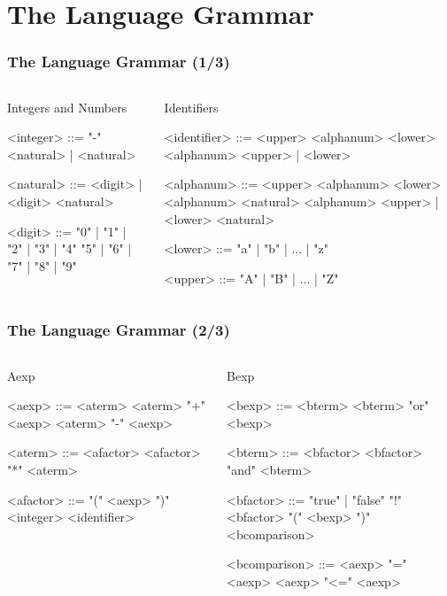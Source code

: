 \documentclass{beamer}
\begin{document}
\section{The Language Grammar}
\begin{frame}[fragile]
\footnotesize
\frametitle{The Language Grammar (1/3)}
\begin{columns}
\begin{block}{Integers and Numbers}
\begin{grammar}
	<integer> ::= "-" <natural> | <natural>

	<natural> ::= <digit> | <digit> <natural>

	<digit> ::= "0" | "1" | "2" | "3" | "4"
	\alt "5" | "6" | "7" | "8" | "9"
\end{grammar}
\end{block}
\begin{block}{Identifiers}
\begin{grammar}
	<identifier> ::= <upper> <alphanum>
	\alt <lower> <alphanum>
	\alt <upper> | <lower> 
	
	<alphanum> ::= <upper> <alphanum>
	\alt <lower> <alphanum>
	\alt <natural> <alphanum>
	\alt <upper> | <lower>
	\alt <natural>

	<lower> ::= "a" | "b" | ... | "z"

	<upper> ::= "A" | "B" | ... | "Z"
\end{grammar}
\end{block}
\end{columns}
\end{frame}
\begin{frame}[fragile]
\footnotesize
\frametitle{The Language Grammar (2/3)}
\begin{columns}
\begin{block}{Aexp}
\begin{grammar}
	<aexp> ::= <aterm>
	\alt <aterm> "+" <aexp>
	\alt <aterm> "-" <aexp>

	<aterm> ::= <afactor>
	\alt <afactor> "*" <aterm>

	<afactor> ::= "(" <aexp> ")"
	\alt <integer>
	\alt <identifier>
\end{grammar}
\end{block}
\begin{block}{Bexp}
\begin{grammar}
	<bexp> ::= <bterm>
	\alt <bterm> "or" <bexp>

	<bterm> ::= <bfactor>
	\alt <bfactor> "and" <bterm>

	<bfactor> ::= "true" | "false"
	\alt "!" <bfactor>
	\alt "(" <bexp> ")"
	\alt <bcomparison>

	<bcomparison> ::= <aexp> "=" <aexp>
	\alt <aexp> "<=" <aexp>
\end{grammar}
\end{block}
\end{columns}
\end{frame}
\end{document}
